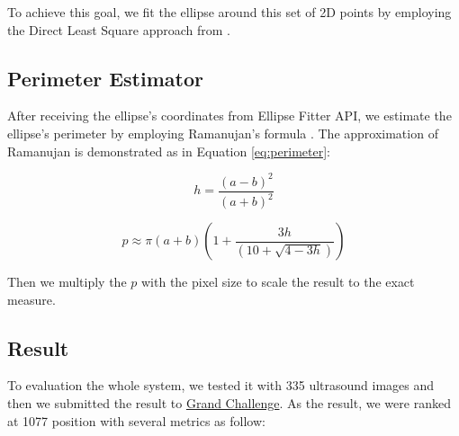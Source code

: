 	To achieve this goal, we fit the ellipse around this set of 2D points by employing the Direct Least Square approach from \cite{direct_ellipse}.
	
\subsection{Perimeter Estimator}
\noindent
	
	After receiving the ellipse's coordinates from Ellipse Fitter API, we estimate the ellipse's perimeter by employing Ramanujan’s formula \cite{perimeter}. The approximation of Ramanujan is demonstrated as in Equation \eqref{eq:perimeter}:
	
	\[ h = \frac{(a-b)^2}{(a+b)^2} \]
	
	\[ p \approx \pi (a+b) (1 + \frac{3h}{(10 + \sqrt{4 - 3h})} ) \label{eq:perimeter} \]

\noindent
	Then we multiply the $p$ with the pixel size to scale the result to the exact measure.
	
\subsection{Result}
\noindent

	To evaluation the whole system, we tested it with 335 ultrasound images and then we submitted the result to  \href{https://hc18.grand-challenge.org/}{Grand Challenge}. As the result, we were ranked at 1077 position with several metrics as follow:
	
